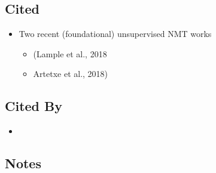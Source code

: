 \documentclass{article}
\begin{document}
\subsection*{Cited}
\begin{itemize}
	\item Two recent (foundational) unsupervised NMT works
	\begin{itemize}
		\item (Lample et al., 2018
		\item Artetxe et al., 2018)
	\end{itemize}
\end{itemize}

\subsection*{Cited By}
\begin{itemize}
	\item
\end{itemize}

\subsection*{Notes}
\end{document}
